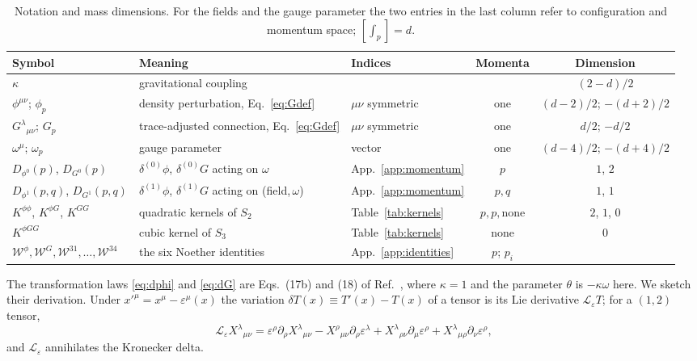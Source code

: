 \documentclass[prd,aps,preprint,nofootinbib,amsmath,amssymb,eqsecnum]{revtex4-2}
\newcommand{\W}{\mathcal{W}}
\newcommand{\ip}[1]{\int_{#1}}
\begin{document}
\begin{table}[htb]
\centering\scriptsize
\setlength{\tabcolsep}{9pt}
\begin{tabular}{@{}lllcc@{}}
\toprule
Symbol & Meaning & Indices & Momenta & Dimension \\
\midrule
$\kappa$ & gravitational coupling & & & $(2-d)/2$ \\
$\phi^{\mu\nu}$; $\phi_p$ & density perturbation, Eq.~\eqref{eq:Gdef} & $\mu\nu$ symmetric & one & $(d-2)/2$; $-(d+2)/2$ \\
$G^{\lambda}{}_{\mu\nu}$; $G_p$ & trace-adjusted connection, Eq.~\eqref{eq:Gdef} & $\mu\nu$ symmetric & one & $d/2$; $-d/2$ \\
$\omega^{\mu}$; $\omega_p$ & gauge parameter & vector & one & $(d-4)/2$; $-(d+4)/2$ \\
$D_{\phi^0}(p)$, $D_{G^0}(p)$ & $\delta^{(0)}\phi$, $\delta^{(0)}G$ acting on $\omega$ & App.~\ref{app:momentum} & $p$ & $1$, $2$ \\
$D_{\phi^1}(p,q)$, $D_{G^1}(p,q)$ & $\delta^{(1)}\phi$, $\delta^{(1)}G$ acting on (field,\,$\omega$) & App.~\ref{app:momentum} & $p,q$ & $1$, $1$ \\
$K^{\phi\phi}$, $K^{\phi G}$, $K^{GG}$ & quadratic kernels of $S_2$ & Table~\ref{tab:kernels} & $p,p,\text{none}$ & $2$, $1$, $0$ \\
$K^{\phi GG}$ & cubic kernel of $S_3$ & Table~\ref{tab:kernels} & none & $0$ \\
$\W^{\phi},\W^{G},\W^{31},\dots,\W^{34}$ & the six Noether identities & App.~\ref{app:identities} & $p$; $p_i$ & \\
\bottomrule
\end{tabular}
\caption{Notation and mass dimensions. For the fields and the gauge parameter the two entries
in the last column refer to configuration and momentum space; $[\ip{p}]=d$.}
\label{tab:notation}
\end{table}

The transformation laws \eqref{eq:dphi} and \eqref{eq:dG} are Eqs.~(17b) and (18) of
Ref.~\cite{BrandtMcKeon2015}, where $\kappa=1$ and the parameter $\theta$ is $-\kappa\omega$
here. We sketch their derivation. Under $x'^\mu=x^\mu-\varepsilon^\mu(x)$ the variation
$\delta T(x)\equiv T'(x)-T(x)$ of a tensor is its Lie derivative $\mathcal{L}_\varepsilon T$;
for a $(1,2)$ tensor,
\begin{equation}
\mathcal{L}_\varepsilon X^{\lambda}{}_{\mu\nu}=\varepsilon^\rho\partial_\rho X^{\lambda}{}_{\mu\nu}
-X^{\rho}{}_{\mu\nu}\partial_\rho\varepsilon^\lambda
+X^{\lambda}{}_{\rho\nu}\partial_\mu\varepsilon^\rho
+X^{\lambda}{}_{\mu\rho}\partial_\nu\varepsilon^\rho ,
\label{eq:lie12}
\end{equation}
and $\mathcal{L}_\varepsilon$ annihilates the Kronecker delta.
\end{document}
